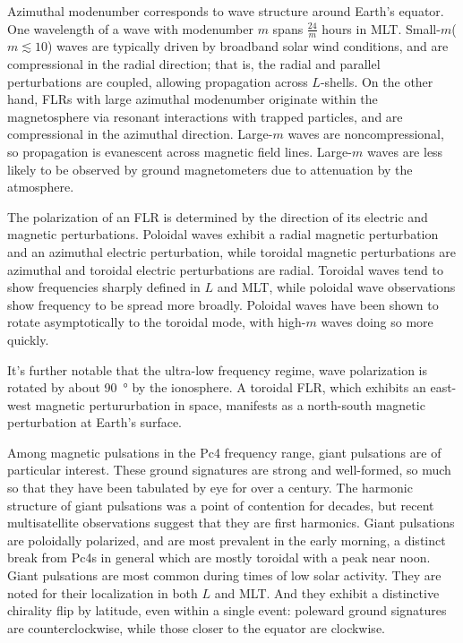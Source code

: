 \documentclass{article}
\newcommand{\azm}{\ensuremath{m}\xspace}
\begin{document}
Azimuthal modenumber corresponds to wave structure around Earth's equator. One wavelength of a wave with modenumber \azm spans $\frac{24}{\azm}$ hours in MLT. Small-\azm ($\azm \lesssim 10$) waves are typically driven by broadband solar wind conditions\cite{degeling_2014,hao_2014,zong_2009,chen_1974,liu_2011,southwood_1974}, and are compressional in the radial direction; that is, the radial and parallel perturbations are coupled, allowing propagation across $L$-shells. On the other hand, FLRs with large azimuthal modenumber originate within the magnetosphere via resonant interactions with trapped particles, and are compressional in the azimuthal direction. Large-\azm waves are noncompressional, so propagation is evanescent across magnetic field lines\cite{cummings_1969,radoski_1974}. Large-\azm waves are less likely to be observed by ground magnetometers due to attenuation by the atmosphere\cite{hughes_1976,wright_1999,yeoman_2001}.

The polarization of an FLR is determined by the direction of its electric and magnetic perturbations. Poloidal waves exhibit a radial magnetic perturbation and an azimuthal electric perturbation, while toroidal magnetic perturbations are azimuthal and toroidal electric perturbations are radial. Toroidal waves tend to show frequencies sharply defined in $L$ and MLT, while poloidal wave observations show frequency to be spread more broadly\cite{engebretson_1986}. Poloidal waves have been shown to rotate asymptotically to the toroidal mode, with high-\azm waves doing so more quickly\cite{mann_1995,mann_1997,radoski_1974}.

It's further notable that the ultra-low frequency regime, wave polarization is rotated by about \SI{90}{\degree} by the ionosphere\cite{nishida_1964_screening}. A toroidal FLR, which exhibits an east-west magnetic pertururbation in space, manifests as a north-south magnetic perturbation at Earth's surface.

Among magnetic pulsations in the Pc4 frequency range, giant pulsations are of particular interest. These ground signatures are strong and well-formed, so much so that they have been tabulated by eye for over a century\cite{birkeland_1901}. The harmonic structure of giant pulsations was a point of contention for decades, but recent multisatellite observations suggest that they are first harmonics\cite{glassmeier_1999,hillebrand_1982,kokubun_1989,takahashi_2011}. Giant pulsations are poloidally polarized, and are most prevalent in the early morning\cite{chisham_1991,glassmeier_1980,rostoker_1979}, a distinct break from Pc4s in general which are mostly toroidal with a peak near noon\cite{anderson_1990}. Giant pulsations are most common during times of low solar activity\cite{brekke_1987}. They are noted for their localization in both $L$ and MLT\cite{anderson_1990}. And they exhibit a distinctive chirality flip by latitude, even within a single event: poleward ground signatures are counterclockwise, while those closer to the equator are clockwise\cite{eleman_1967}.
\end{document}

